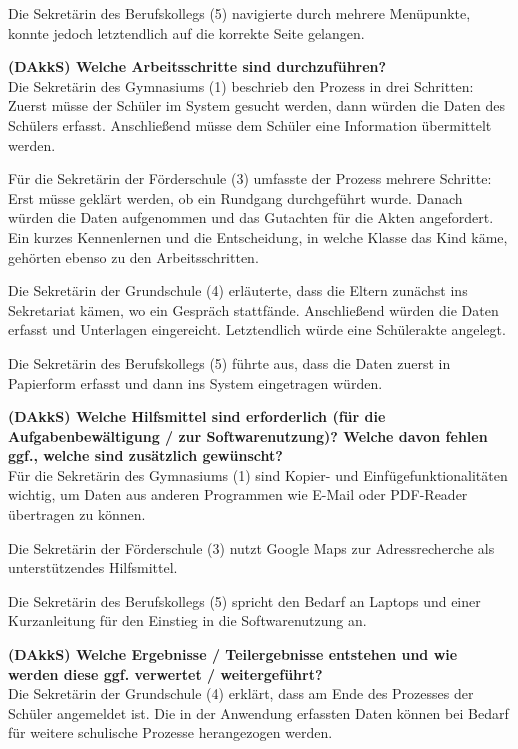 Die Sekretärin des Berufskollegs (5) navigierte durch mehrere Menüpunkte, konnte jedoch letztendlich auf die korrekte Seite gelangen. 

\textbf{(DAkkS) Welche Arbeitsschritte sind durchzuführen?}\\
Die Sekretärin des Gymnasiums (1) beschrieb den Prozess in drei Schritten: Zuerst müsse der Schüler im System gesucht werden, dann würden die Daten des Schülers erfasst. Anschließend müsse dem Schüler eine Information übermittelt werden.

Für die Sekretärin der Förderschule (3) umfasste der Prozess mehrere Schritte: Erst müsse geklärt werden, ob ein Rundgang durchgeführt wurde. Danach würden die Daten aufgenommen und das Gutachten für die Akten angefordert. Ein kurzes Kennenlernen und die Entscheidung, in welche Klasse das Kind käme, gehörten ebenso zu den Arbeitsschritten.

Die Sekretärin der Grundschule (4) erläuterte, dass die Eltern zunächst ins Sekretariat kämen, wo ein Gespräch stattfände. Anschließend würden die Daten erfasst und Unterlagen eingereicht. Letztendlich würde eine Schülerakte angelegt.

Die Sekretärin des Berufskollegs (5) führte aus, dass die Daten zuerst in Papierform erfasst und dann ins System eingetragen würden.


\textbf{(DAkkS) Welche Hilfsmittel sind erforderlich (für die Aufgabenbewältigung / zur Softwarenutzung)? Welche davon fehlen ggf., welche sind zusätzlich gewünscht?}\\
Für die Sekretärin des Gymnasiums (1) sind Kopier- und Einfügefunktionalitäten wichtig, um Daten aus anderen Programmen wie E-Mail oder PDF-Reader übertragen zu können.

Die Sekretärin der Förderschule (3) nutzt Google Maps zur Adressrecherche als unterstützendes Hilfsmittel.

Die Sekretärin des Berufskollegs (5) spricht den Bedarf an Laptops und einer Kurzanleitung für den Einstieg in die Softwarenutzung an.

\textbf{(DAkkS) Welche Ergebnisse / Teilergebnisse entstehen und wie werden diese ggf. verwertet / weitergeführt?}\\
Die Sekretärin der Grundschule (4) erklärt, dass am Ende des Prozesses der Schüler angemeldet ist. Die in der Anwendung erfassten Daten können bei Bedarf für weitere schulische Prozesse herangezogen werden.

